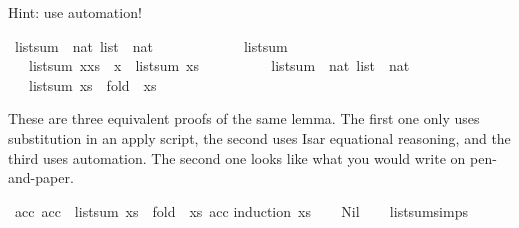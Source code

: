 \begin{isabellebody}
\begin{isamarkuptext}
  Hint: use automation!%
\end{isamarkuptext}\isamarkuptrue%
\isamarkupfalse%
\ list{\isacharunderscore}{\kern0pt}sum\ {\isacharcolon}{\kern0pt}{\isacharcolon}{\kern0pt}\ {\isachardoublequoteopen}nat\ list\ {\isasymRightarrow}\ nat{\isachardoublequoteclose}\ \isanewline
\ \ \ \ \isanewline
\ \ \isanewline
\ \ \ \ {\isachardoublequoteopen}list{\isacharunderscore}{\kern0pt}sum\ {\isacharbrackleft}{\kern0pt}{\isacharbrackright}{\kern0pt}\ {\isacharequal}{\kern0pt}\ {}{\isachardoublequoteclose}\isanewline
\ \ {\isacharbar}{\kern0pt}\ {\isachardoublequoteopen}list{\isacharunderscore}{\kern0pt}sum\ {\isacharparenleft}{\kern0pt}x{\isacharhash}{\kern0pt}xs{\isacharparenright}{\kern0pt}\ {\isacharequal}{\kern0pt}\ x\ {\isacharplus}{\kern0pt}\ list{\isacharunderscore}{\kern0pt}sum\ xs{\isachardoublequoteclose}\ \ \isanewline
\ \ \ \ \ \ \isanewline
\isanewline
\isanewline
\isanewline
{}\isamarkupfalse%
\ list{\isacharunderscore}{\kern0pt}sum{\isacharprime}{\kern0pt}\ {\isacharcolon}{\kern0pt}{\isacharcolon}{\kern0pt}\ {\isachardoublequoteopen}nat\ list\ {\isasymRightarrow}\ nat{\isachardoublequoteclose}\isanewline
\ \ \ \ \isanewline
\ \ \ {\isachardoublequoteopen}list{\isacharunderscore}{\kern0pt}sum{\isacharprime}{\kern0pt}\ xs\ {\isasymequiv}\ fold\ {\isacharparenleft}{\kern0pt}{\isacharplus}{\kern0pt}{\isacharparenright}{\kern0pt}\ xs\ {}{\isachardoublequoteclose}%
\begin{isamarkuptext}%
These are three equivalent proofs of the same lemma. The first one only uses substitution in
      an apply script, the second uses Isar equational reasoning, and the third uses automation. The
      second one looks like what you would write on pen-and-paper.%
\end{isamarkuptext}\isamarkuptrue%
\isamarkupfalse%
\ {\isachardoublequoteopen}{\isasymAnd}acc{\isachardot}{\kern0pt}\ acc\ {\isacharplus}{\kern0pt}\ list{\isacharunderscore}{\kern0pt}sum\ xs\ {\isacharequal}{\kern0pt}\ fold\ {\isacharparenleft}{\kern0pt}{\isacharplus}{\kern0pt}{\isacharparenright}{\kern0pt}\ xs\ acc{\isachardoublequoteclose}\isanewline
%
\isadelimproof
%
\endisadelimproof
%
\isatagproof
{}\isamarkupfalse%
{\isacharparenleft}{\kern0pt}induction\ xs{\isacharparenright}{\kern0pt}\isanewline
\ \ \isamarkupfalse%
\ Nil\isanewline
\ \ \isamarkupfalse%
\ list{\isacharunderscore}{\kern0pt}sum{\isachardot}{\kern0pt}simps{\isacharparenleft}{\kern0pt}{}{\isacharparenright}{\kern0pt}\isanewline

\end{isabellebody}
